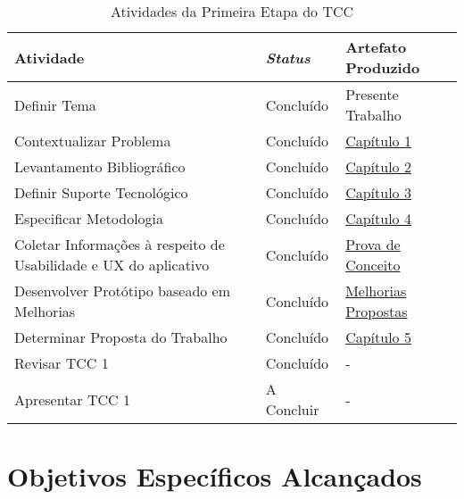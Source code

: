 \begin{table}[h!]
	\centering
	\caption{Atividades da Primeira Etapa do TCC}
	\label{tab09}
	\begin{tabularx}{\textwidth}{p{8cm}|p{2cm}|p{4cm}}
	\hline
    Atividade                                                        & \textit{Status}       & Artefato Produzido             \\ \hline
    Definir Tema                                                     & Concluído    & Presente Trabalho              \\
    Contextualizar Problema                                          & Concluído    & \hyperref[chap:Introducao]{Capítulo 1}                   \\
    Levantamento Bibliográfico                                       & Concluído    & \hyperref[chap:Referencial]{Capítulo 2}                     \\
    Definir Suporte Tecnológico                                      & Concluído    & \hyperref[chap:ReferencialTech]{Capítulo 3}                   \\
    Especificar Metodologia                                          & Concluído    & \hyperref[chap:Metodologia]{Capítulo 4}                     \\
    Coletar Informações à respeito de Usabilidade e UX do aplicativo & Concluído    & \hyperref[sec:Prova de Conceito]{Prova de Conceito} \\
    Desenvolver Protótipo baseado em Melhorias                       & Concluído    & \hyperref[sec:Melhorias Propostas]{Melhorias Propostas}         \\
    Determinar Proposta do Trabalho                                  & Concluído    & \hyperref[chap:Aplicativo Multilind]{Capítulo 5}                     \\
    Revisar TCC 1                                                    & Concluído    & -                              \\ 
    Apresentar TCC 1                                                 & A Concluir   & -                              \\ \hline
	\end{tabularx}
\end{table}

\section{Objetivos Específicos Alcançados}
\label{sec:Objetivos Especificos Alcancados}

